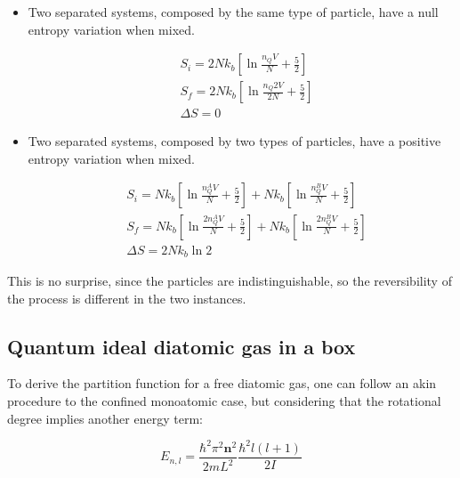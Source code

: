 \documentclass{article}
\begin{document}
\begin{itemize}
    \item Two separated systems, composed by the same type of particle, have a null entropy variation when mixed.

          \begin{equation}
              \begin{aligned}
                   & S_i=2Nk_b\left[\ln{\frac{n_QV}{N}}+\frac{5}{2}\right]   \\
                   & S_f=2Nk_b\left[\ln{\frac{n_Q2V}{2N}}+\frac{5}{2}\right] \\
                   & \Delta S=0
              \end{aligned}
          \end{equation}

    \item Two separated systems, composed by two types of particles, have a positive entropy variation when mixed.

          \begin{equation}
              \begin{aligned}
                   & S_i=Nk_b\left[\ln{\frac{n_Q^AV}{N}}+\frac{5}{2}\right]+Nk_b\left[\ln{\frac{n_Q^BV}{N}}+\frac{5}{2}\right]    \\
                   & S_f= Nk_b\left[\ln{\frac{2n_Q^AV}{N}}+\frac{5}{2}\right]+Nk_b\left[\ln{\frac{2n_Q^BV}{N}}+\frac{5}{2}\right] \\
                   & \Delta S=2Nk_b\ln{2}
              \end{aligned}
          \end{equation}
\end{itemize}

This is no surprise, since the particles are indistinguishable, so the reversibility of the process is different in the two instances.

\subsection{Quantum ideal diatomic gas in a box}

To derive the partition function for a free diatomic gas, one can follow
an akin procedure to the confined monoatomic case, but considering that the rotational degree implies another energy term:

\begin{equation}
    E_{n,l}=\frac{\hbar^2\pi^2 \textbf{n}^2}{2mL^2}\frac{\hbar^2 l(l+1)}{2I}
\end{equation}
\end{document}
